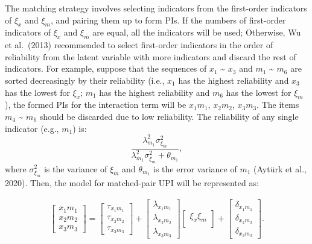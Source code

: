 \documentclass[
  man]{apa7}
\begin{document}
The matching strategy involves selecting indicators from the first-order indicators of \(\xi_{x}\) and \(\xi_{m}\), and pairing them up to form PIs. If the numbers of first-order indicators of \(\xi_{x}\) and \(\xi_{m}\) are equal, all the indicators will be used; Otherwise, Wu et al.~(2013) recommended to select first-order indicators in the order of reliability from the latent variable with more indicators and discard the rest of indicators. For example, suppose that the sequences of \(x_{1}\) \textasciitilde{} \(x_{3}\) and \(m_{1}\) \textasciitilde{} \(m_{6}\) are sorted decreasingly by their reliability (i.e., \(x_{1}\) has the highest reliability and \(x_{3}\) has the lowest for \(\xi_{x}\); \(m_{1}\) has the highest reliability and \(m_{6}\) has the lowest for \(\xi_{m}\)), the formed PIs for the interaction term will be \(x_{1}m_{1}\), \(x_{2}m_{2}\), \(x_{3}m_{3}\). The items \(m_{4}\) \textasciitilde{} \(m_{6}\) should be discarded due to low reliability. The reliability of any single indicator (e.g., \(m_{1}\)) is:
\begin{equation}
\frac{\lambda_{m_{1}}^2\sigma_{\xi_{m}}^2}{\lambda_{m_{1}}^2\sigma_{\xi_{m}}^2 + \theta_{m_{1}}},
\end{equation}
where \(\sigma_{\xi_{m}}^2\) is the variance of \(\xi_{m}\) and \(\theta_{m_{1}}\) is the error variance of \(m_{1}\) (Aytürk et al., 2020). Then, the model for matched-pair UPI will be represented as:

\begin{align}
    \begin{bmatrix}
        x_{1}m_{1} \\
        x_{2}m_{2} \\
        x_{3}m_{3}
    \end{bmatrix} =
    \begin{bmatrix}
        \tau_{x_{1}m_{1}} \\
        \tau_{x_{2}m_{2}} \\ 
        \tau_{x_{3}m_{3}}
    \end{bmatrix} + 
    \begin{bmatrix}
        \lambda_{x_{1}m_{1}} \\
        \lambda_{x_{2}m_{2}} \\ 
        \lambda_{x_{3}m_{3}} 
    \end{bmatrix}
    \begin{bmatrix}
        \xi_{x}\xi_{m} \\
    \end{bmatrix} +
    \begin{bmatrix}
        \delta_{x_{1}m_{1}} \\
        \delta_{x_{2}m_{2}} \\ 
        \delta_{x_{3}m_{3}}
    \end{bmatrix}.
\end{align}
\end{document}
